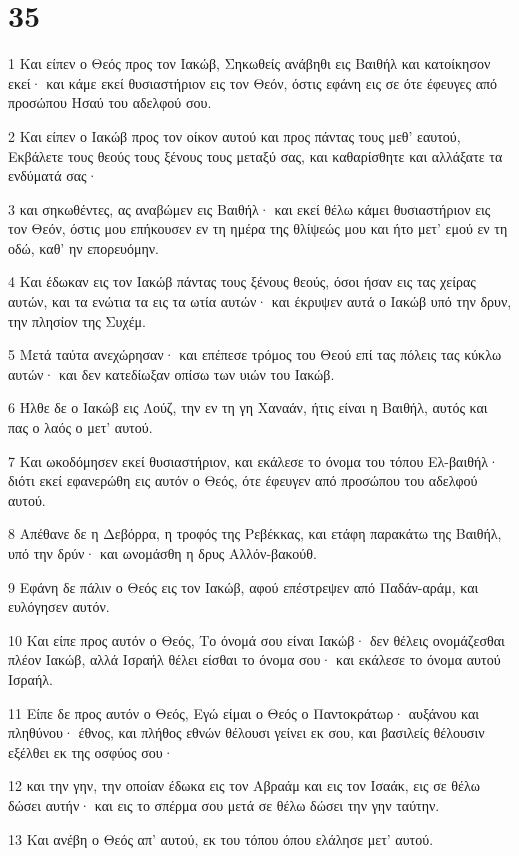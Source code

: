 \chapter{35}

\par 1 Και είπεν ο Θεός προς τον Ιακώβ, Σηκωθείς ανάβηθι εις Βαιθήλ και κατοίκησον εκεί· και κάμε εκεί θυσιαστήριον εις τον Θεόν, όστις εφάνη εις σε ότε έφευγες από προσώπου Ησαύ του αδελφού σου.
\par 2 Και είπεν ο Ιακώβ προς τον οίκον αυτού και προς πάντας τους μεθ' εαυτού, Εκβάλετε τους θεούς τους ξένους τους μεταξύ σας, και καθαρίσθητε και αλλάξατε τα ενδύματά σας·
\par 3 και σηκωθέντες, ας αναβώμεν εις Βαιθήλ· και εκεί θέλω κάμει θυσιαστήριον εις τον Θεόν, όστις μου επήκουσεν εν τη ημέρα της θλίψεώς μου και ήτο μετ' εμού εν τη οδώ, καθ' ην επορευόμην.
\par 4 Και έδωκαν εις τον Ιακώβ πάντας τους ξένους θεούς, όσοι ήσαν εις τας χείρας αυτών, και τα ενώτια τα εις τα ωτία αυτών· και έκρυψεν αυτά ο Ιακώβ υπό την δρυν, την πλησίον της Συχέμ.
\par 5 Μετά ταύτα ανεχώρησαν· και επέπεσε τρόμος του Θεού επί τας πόλεις τας κύκλω αυτών· και δεν κατεδίωξαν οπίσω των υιών του Ιακώβ.
\par 6 Ήλθε δε ο Ιακώβ εις Λούζ, την εν τη γη Χαναάν, ήτις είναι η Βαιθήλ, αυτός και πας ο λαός ο μετ' αυτού.
\par 7 Και ωκοδόμησεν εκεί θυσιαστήριον, και εκάλεσε το όνομα του τόπου Ελ-βαιθήλ· διότι εκεί εφανερώθη εις αυτόν ο Θεός, ότε έφευγεν από προσώπου του αδελφού αυτού.
\par 8 Απέθανε δε η Δεβόρρα, η τροφός της Ρεβέκκας, και ετάφη παρακάτω της Βαιθήλ, υπό την δρύν· και ωνομάσθη η δρυς Αλλόν-βακούθ.
\par 9 Εφάνη δε πάλιν ο Θεός εις τον Ιακώβ, αφού επέστρεψεν από Παδάν-αράμ, και ευλόγησεν αυτόν.
\par 10 Και είπε προς αυτόν ο Θεός, Το όνομά σου είναι Ιακώβ· δεν θέλεις ονομάζεσθαι πλέον Ιακώβ, αλλά Ισραήλ θέλει είσθαι το όνομα σου· και εκάλεσε το όνομα αυτού Ισραήλ.
\par 11 Είπε δε προς αυτόν ο Θεός, Εγώ είμαι ο Θεός ο Παντοκράτωρ· αυξάνου και πληθύνου· έθνος, και πλήθος εθνών θέλουσι γείνει εκ σου, και βασιλείς θέλουσιν εξέλθει εκ της οσφύος σου·
\par 12 και την γην, την οποίαν έδωκα εις τον Αβραάμ και εις τον Ισαάκ, εις σε θέλω δώσει αυτήν· και εις το σπέρμα σου μετά σε θέλω δώσει την γην ταύτην.
\par 13 Και ανέβη ο Θεός απ' αυτού, εκ του τόπου όπου ελάλησε μετ' αυτού.
